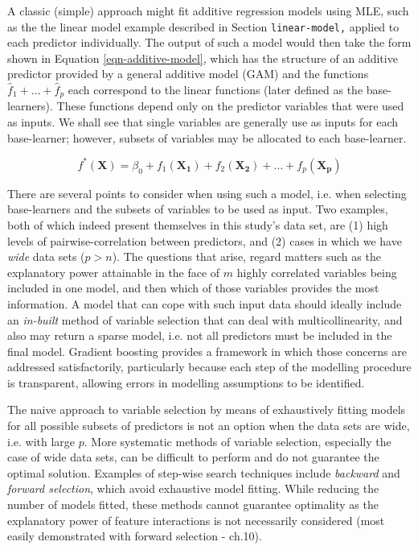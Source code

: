 \documentclass{article}
\begin{document}
A classic (simple) approach might fit additive regression models using MLE, such as the the linear model example described in Section \texttt{linear-model,} applied to each predictor individually. The output of such a model would then take the form shown in Equation \eqref{eqn-additive-model}, which has the structure of an additive predictor provided by a general additive model (GAM) \cite{Hastie2009} and the functions $\hat f_{1} + … + \hat f_{p}$ each correspond to the linear functions (later defined as the base-learners). These functions depend only on the predictor variables that were used as inputs. We shall see that single variables are generally use as inputs for each base-learner; however, subsets of variables may be allocated to each base-learner.

\begin{equation}
  \label{eqn-additive-model}
  f^* (\mathbf{X}) = \beta_0 + f_1 (\mathbf{X_1}) + f_2 (\mathbf{X_2}) + … + f_p (\mathbf{X_p})
\end{equation}

\vspace{3mm}

There are several points to consider when using such a model, i.e. when selecting base-learners and the subsets of variables to be used as input. Two examples, both of which indeed present themselves in this study's data set, are (1) high levels of pairwise-correlation between predictors, and (2) cases in which we have \emph{wide} data sets ($p > n$). The questions that arise, regard matters such as the explanatory power attainable in the face of $m$ highly correlated variables being included in one model, and then which of those variables provides the most information. A model that can cope with such input data should ideally include an \emph{in-built} method of variable selection that can deal with multicollinearity, and also may return a sparse model, i.e. not all predictors must be included in the final model. Gradient boosting provides a framework in which those concerns are addressed satisfactorily, particularly because each step of the modelling procedure is transparent, allowing errors in modelling assumptions to be identified.

The naive approach to variable selection by means of exhaustively fitting models for all possible subsets of predictors is not an option when the data sets are wide, i.e. with large $p$. More systematic methods of variable selection, especially the case of wide data sets, can be difficult to perform and do not guarantee the optimal solution. Examples of step-wise search techniques include \emph{backward} and \emph{forward selection}, which avoid exhaustive model fitting. While reducing the number of models fitted, these methods cannot guarantee optimality as the explanatory power of feature interactions is not necessarily considered (most easily demonstrated with forward selection - \cite{Fukunaga1990441} ch.10).
\end{document}
